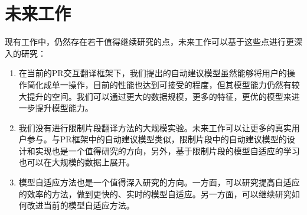 \documentclass[master, winfont]{njuthesis}
\begin{document}
\section{未来工作}
现有工作中，仍然存在若干值得继续研究的点，未来工作可以基于这些点进行更深入的研究：
\begin{enumerate}
  \item 在当前的PR交互翻译框架下，我们提出的自动建议模型虽然能够将用户的操作简化成单一操作，目前的性能也达到可接受的程度，但其模型能力仍然有较大提升的空间。我们可以通过更大的数据规模，更多的特征，更优的模型来进一步提升模型能力。
  \item 我们没有进行限制片段翻译方法的大规模实验。未来工作可以让更多的真实用户参与。与PR框架中的自动建议模型类似，限制片段中的自动建议模型的设计和实现也是一个值得研究的方向，另外，基于限制片段的模型自适应的学习也可以在大规模的数据上展开。
  \item 模型自适应方法也是一个值得深入研究的方向。一方面，可以研究提高自适应的效率的方法，做到更快的、实时的模型自适应。另一方面，可以继续研究如何改进当前的模型自适应方法。
\end{enumerate}
\nocite{*}

%
%
\end{document}

